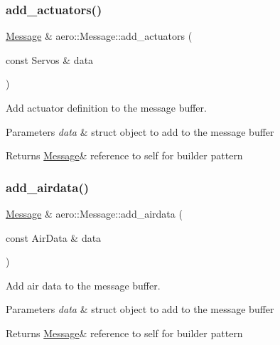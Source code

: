 \subsubsection{\texorpdfstring{add\+\_\+actuators()}{add\_actuators()}}
{\footnotesize\ttfamily \hyperlink{classaero_1_1Message}{Message} \& aero\+::\+Message\+::add\+\_\+actuators (\begin{DoxyParamCaption}\item[{const Servos \&}]{data }\end{DoxyParamCaption})}



Add actuator definition to the message buffer. 


\begin{DoxyParams}{Parameters}
{\em data} & struct object to add to the message buffer \\
\hline
\end{DoxyParams}
\begin{DoxyReturn}{Returns}
\hyperlink{classaero_1_1Message}{Message}\& reference to self for builder pattern 
\end{DoxyReturn}
\mbox{\label{classaero_1_1Message_a67c34e4f8bf44765914dae130b292ab7}} 
\subsubsection{\texorpdfstring{add\+\_\+airdata()}{add\_airdata()}}
{\footnotesize\ttfamily \hyperlink{classaero_1_1Message}{Message} \& aero\+::\+Message\+::add\+\_\+airdata (\begin{DoxyParamCaption}\item[{const Air\+Data \&}]{data }\end{DoxyParamCaption})}



Add air data to the message buffer. 


\begin{DoxyParams}{Parameters}
{\em data} & struct object to add to the message buffer \\
\hline
\end{DoxyParams}
\begin{DoxyReturn}{Returns}
\hyperlink{classaero_1_1Message}{Message}\& reference to self for builder pattern 
\end{DoxyReturn}
\mbox{\label{classaero_1_1Message_aac514c46af35b6ddfda4f2f8b1d4a259}} 
